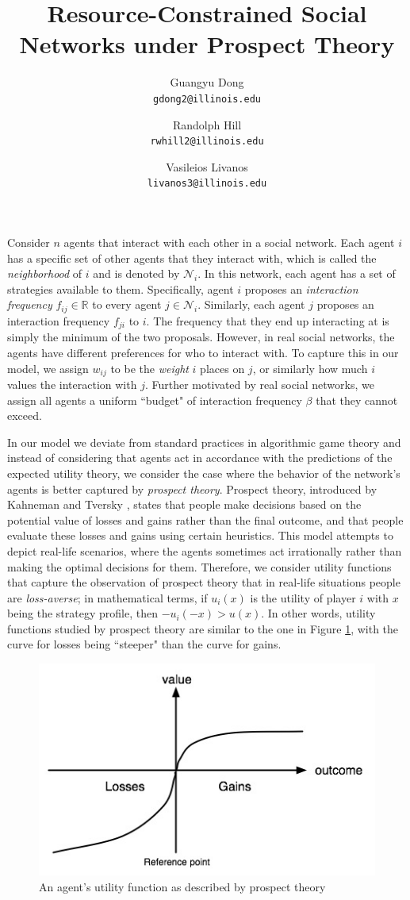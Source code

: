 \documentclass[A4paper,11pt]{article}
\author{
	{\sc Guangyu Dong} \\
	\texttt{gdong2@illinois.edu}
	\and
	{\sc Randolph Hill} \\
	\texttt{rwhill2@illinois.edu}
	\and
	{\sc Vasileios Livanos} \\
	\texttt{livanos3@illinois.edu}
}
\title{
Resource-Constrained Social Networks under Prospect Theory
}
\date{}
\begin{document}
 \maketitle

\par Consider $n$ agents that interact with each other in a social network. Each agent $i$ has a specific set of other agents
that they interact with, which is called the \textit{neighborhood} of $i$ and is denoted by $\mathcal{N}_i$. In this network,
each agent has a set of strategies available to them. Specifically, agent $i$ proposes an \textit{interaction frequency}
$f_{ij} \in \mathbb{R}$ to every agent $j \in \mathcal{N}_i$. Similarly, each agent $j$ proposes an
interaction frequency $f_{ji}$ to $i$. The frequency that they end up interacting at is simply the minimum of the two
proposals. However, in real social networks, the agents have different preferences for who to interact with. To capture this
in our model, we assign $w_{ij}$ to be the \textit{weight} $i$ places on $j$, or similarly how much $i$ values the interaction
with $j$. Further motivated by real social networks, we assign all agents a uniform ``budget" of interaction frequency $\beta$
that they cannot exceed.

\par In our model we deviate from standard practices in algorithmic game theory and instead of considering that agents act
in accordance with the predictions of the expected utility theory, we consider the case where the behavior of the network's
agents is better captured by \textit{prospect theory}. Prospect theory, introduced by Kahneman and Tversky \cite{KT}, states
that people make decisions based on the potential value of losses and gains rather than the final outcome, and that people
evaluate these losses and gains using certain heuristics. This model attempts to depict real-life scenarios, where the agents
sometimes act irrationally rather than making the optimal decisions for them. Therefore, we consider utility functions that
capture the observation of prospect theory that in real-life situations people are \textit{loss-averse}; in mathematical terms,
if $u_i(x)$ is the utility of player $i$ with $x$ being the strategy profile, then $- u_i(-x) > u(x)$. In other words, utility
functions studied by prospect theory are similar to the one in Figure \ref{fig:prospect-util}, with the curve for losses being
``steeper" than the curve for gains.

\begin{figure}[h!]
  \centering
  \includegraphics[width=.30\linewidth]{./Valuefun.jpg}
  \caption{An agent's utility function as described by prospect theory}
  \label{fig:prospect-util}
\end{figure}
\end{document}
